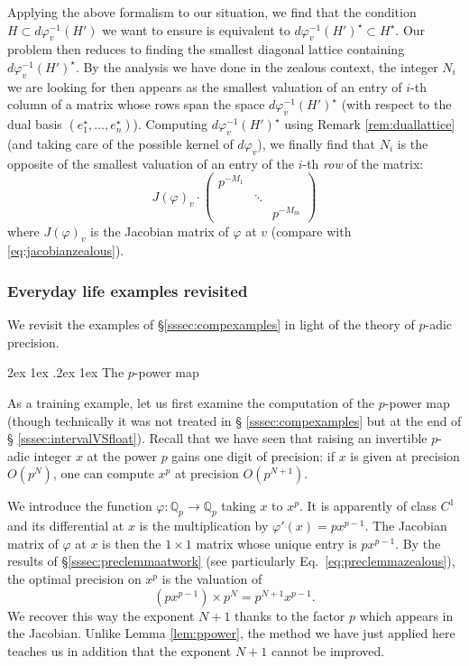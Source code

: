 \documentclass[11pt]{article}
\makeatletter
\numberwithin{equation}{section}
\numberwithin{figure}{section}
\renewcommand\paragraph{\@startsection{paragraph}{4}{\z@}%
                                    {2ex \@plus1ex \@minus.2ex}%
                                    {1ex}%
                                    {\normalfont\normalsize\bfseries}}
\theoremstyle{definition}
\newcommand{\Q}{\mathbb Q}
\newcommand{\Qp}{\Q_p}
\makeatother
\begin{document}
Applying the above formalism to our situation, we find that the 
condition $H \subset d\varphi_v^{-1}(H')$ we want to ensure is 
equivalent to $d\varphi_v^{-1}(H')^\star \subset H^\star$. Our problem 
then reduces to finding the smallest diagonal lattice containing 
$d\varphi_v^{-1}(H')^\star$. By the analysis we have done in the
zealous context, the 
integer $N_i$ we are looking for then appears as the smallest valuation 
of an entry of $i$-th column of a matrix whose rows span the space 
$d\varphi_v^{-1}(H')^\star$ (with respect to the dual basis $(e_1^\star, 
\ldots, e_n^\star)$). Computing $d\varphi_v^{-1}(H')^\star$ using
Remark \ref{rem:duallattice} (and taking care of the possible kernel of 
$d\varphi_v$), we finally find that $N_i$ is the opposite of the 
smallest valuation of an entry of the $i$-th \emph{row} of the matrix:
$$J(\varphi)_v \cdot
\left( \begin{matrix}
p^{-M_1} & & \\ & \ddots & \\ & & p^{-M_m}
\end{matrix}\right)$$
where $J(\varphi)_v$ is the Jacobian matrix of $\varphi$ at $v$ (compare 
with \eqref{eq:jacobianzealous}).

\subsubsection{Everyday life examples revisited}
\label{sssec:diffexamples}

We revisit the examples of \S \ref{sssec:compexamples} in light of the 
theory of $p$-adic precision.

\paragraph{The $p$-power map}

As a training example, let us first examine the computation of the 
$p$-power map (though technically it was not treated in \S 
\ref{sssec:compexamples} but at the end of \S 
\ref{sssec:intervalVSfloat}). Recall that we have seen that raising an 
invertible $p$-adic integer $x$ at the power $p$ gains one digit of 
precision: if $x$ is given at precision $O(p^N)$, one can compute $x^p$ 
at precision $O(p^{N+1})$.

We introduce the function $\varphi : \Qp \to \Qp$ taking $x$ to $x^p$. 
It is apparently of class $C^1$ and its differential at $x$ is the 
multiplication by $\varphi'(x) = p x^{p-1}$. The Jacobian matrix of
$\varphi$ at $x$ is then the $1 \times 1$ matrix whose unique entry
is $p x^{p-1}$. By the results of \S \ref{sssec:preclemmaatwork} 
(see particularly Eq.~\eqref{eq:preclemmazealous}), the optimal 
precision on $x^p$ is the valuation of 
$$(p x^{p-1}) \times p^N = p^{N+1} x^{p-1}.$$
We recover this way the exponent $N{+}1$ thanks to the factor $p$ 
which appears in the Jacobian. Unlike Lemma \ref{lem:ppower},
the method we have just applied here teaches us in addition that
the exponent $N{+}1$ cannot be improved.
\end{document}
